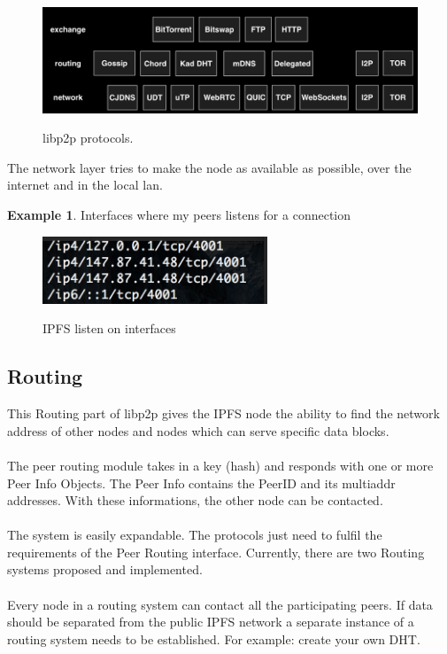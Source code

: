 \documentclass[a4paper,11pt, oneside]{report}
\theoremstyle{definition}
\newtheorem{exmp}{Example}[subsection]
\begin{document}
\begin{figure}[H]
\centering
\includegraphics[width=\textwidth]{img/libp2p-protocols.png}\\[0.2cm]
\caption[libp2p]{libp2p protocols.}
\end{figure}

\noindent
The network layer tries to make the node as available as possible, over the internet and in the local lan. 

\begin{exmp} Interfaces where my peers listens for a connection
\begin{figure}[H]
\centering
\includegraphics[width=0.6\textwidth]{img/ipfs-network-listen.png}\\[0.2cm]
\caption[IPFS listen interfaces]{IPFS listen on interfaces}
\end{figure}
\end{exmp}

\newpage

\subsection{Routing}
This Routing part of libp2p gives the IPFS node the ability to find the network address of other nodes and nodes which can serve specific data blocks.\\ \\
The peer routing module takes in a key (hash) and responds with one or more Peer Info Objects. The Peer Info contains the PeerID and its multiaddr addresses. With these informations, the other node can be contacted.\\ \\
The system is easily expandable. The protocols just need to fulfil the requirements of the Peer Routing interface. Currently, there are two Routing systems proposed and implemented.\\ \\
Every node in a routing system can contact all the participating peers. If data should be separated from the public IPFS network a separate instance of a routing system needs to be established. For example: create your own DHT.
\end{document}
